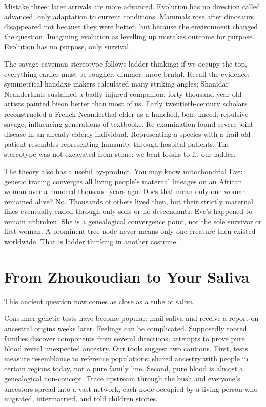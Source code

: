 Mistake three: later arrivals are more advanced. Evolution has no direction called advanced, only adaptation to current conditions. Mammals rose after dinosaurs disappeared not because they were better, but because the environment changed the question. Imagining evolution as levelling up mistakes outcome for purpose. Evolution has no purpose, only survival.

The savage-caveman stereotype follows ladder thinking: if we occupy the top, everything earlier must be rougher, dimmer, more brutal. Recall the evidence: symmetrical handaxe makers calculated many striking angles; Shanidar Neanderthals sustained a badly injured companion; forty-thousand-year-old artists painted bison better than most of us. Early twentieth-century scholars reconstructed a French Neanderthal elder as a hunched, bent-kneed, repulsive savage, influencing generations of textbooks. Re-examination found severe joint disease in an already elderly individual. Representing a species with a frail old patient resembles representing humanity through hospital patients. The stereotype was not excavated from stone: we bent fossils to fit our ladder.

The theory also has a useful by-product. You may know mitochondrial Eve: genetic tracing converges all living people's maternal lineages on an African woman over a hundred thousand years ago. Does that mean only one woman remained alive? No. Thousands of others lived then, but their strictly maternal lines eventually ended through only sons or no descendants. Eve's happened to remain unbroken. She is a genealogical convergence point, not the sole survivor or first woman. A prominent tree node never means only one creature then existed worldwide. That is ladder thinking in another costume.

\section{From Zhoukoudian to Your Saliva}
This ancient question now comes as close as a tube of saliva.

Consumer genetic tests have become popular: mail saliva and receive a report on ancestral origins weeks later. Feelings can be complicated. Supposedly rooted families discover components from several directions; attempts to prove pure blood reveal unexpected ancestry. Our tools suggest two cautions. First, tests measure resemblance to reference populations: shared ancestry with people in certain regions today, not a pure family line. Second, pure blood is almost a genealogical non-concept. Trace upstream through the bush and everyone's ancestors spread into a vast network, each node occupied by a living person who migrated, intermarried, and told children stories.

